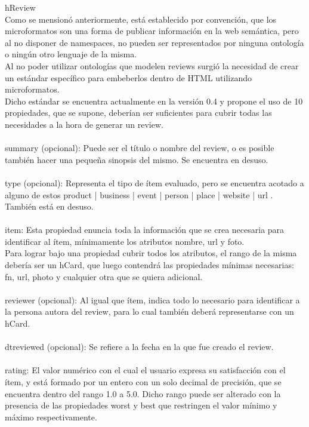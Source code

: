 hReview\\
Como se mensionó anteriormente, está establecido por convención, que los microformatos son una forma de publicar información en la 
web semántica, pero al no disponer de namespaces, no pueden ser representados por ninguna ontología o ningún otro lenguaje de la misma. \\
Al no poder utilizar ontologías que modelen reviews surgió la necesidad de crear un estándar específico para embeberlos dentro de HTML 
utilizando microformatos.\\
Dicho estándar se encuentra actualmente en la versión 0.4 y propone el uso de 10 propiedades, que se supone, deberían ser 
suficientes para cubrir todas las necesidades a la hora de generar un review.\\
\\
summary (opcional): Puede ser el título o nombre del review, o es posible también hacer una pequeña sinopsis del mismo. Se encuentra en desuso.\\
\\
type (opcional): Representa el tipo de ítem evaluado, pero se encuentra acotado a alguno de estos  product | business | event | person | place | website | url .\\
También está en desuso.\\
\\
item: Esta propiedad enuncia toda la información que se crea necesaria para identificar al ítem, mínimamente los atributos nombre, url y foto.\\
Para lograr bajo una propiedad cubrir todos los atributos, el rango de la misma debería ser un hCard, que luego contendrá las propiedades mínimas necesarias: 
fn, url, photo y cualquier otra que se quiera adicional.\\
\\
reviewer (opcional): Al igual que ítem, indica todo lo necesario para identificar a la persona autora del review, para lo cual también deberá representarse 
con un hCard. \\
\\
dtreviewed (opcional): Se refiere a la fecha en la que fue creado el review. \\
\\
rating: El valor numérico con el cual el usuario expresa su satisfacción con el ítem, y está formado por un entero con un solo decimal 
de precisión, que se encuentra dentro del rango 1.0 a 5.0. Dicho rango puede ser alterado con la presencia de las propiedades worst y best 
que restringen el valor mínimo y máximo respectivamente.\\

